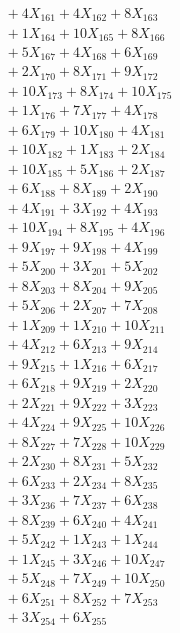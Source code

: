 \documentclass[a4paper,10pt]{article}
\begin{document}
{\begin{align}
&\;  + 4 X_{161} + 4 X_{162} + 8 X_{163} \\[0.5ex]\allowbreak
&\;  + 1 X_{164} + 10 X_{165} + 8 X_{166} \\[0.3ex]
&\;  + 5 X_{167} + 4 X_{168} + 6 X_{169} \\[0.3ex]
&\;  + 2 X_{170} + 8 X_{171} + 9 X_{172} \\[0.3ex]
&\;  + 10 X_{173} + 8 X_{174} + 10 X_{175} \\[0.3ex]
&\;  + 1 X_{176} + 7 X_{177} + 4 X_{178} \\[0.3ex]
&\;  + 6 X_{179} + 10 X_{180} + 4 X_{181} \\[0.3ex]
&\;  + 10 X_{182} + 1 X_{183} + 2 X_{184} \\[0.3ex]
&\;  + 10 X_{185} + 5 X_{186} + 2 X_{187} \\[0.3ex]
&\;  + 6 X_{188} + 8 X_{189} + 2 X_{190} \\[0.3ex]
&\;  + 4 X_{191} + 3 X_{192} + 4 X_{193} \\[0.5ex]\allowbreak
&\;  + 10 X_{194} + 8 X_{195} + 4 X_{196} \\[0.3ex]
&\;  + 9 X_{197} + 9 X_{198} + 4 X_{199} \\[0.3ex]
&\;  + 5 X_{200} + 3 X_{201} + 5 X_{202} \\[0.3ex]
&\;  + 8 X_{203} + 8 X_{204} + 9 X_{205} \\[0.3ex]
&\;  + 5 X_{206} + 2 X_{207} + 7 X_{208} \\[0.3ex]
&\;  + 1 X_{209} + 1 X_{210} + 10 X_{211} \\[0.3ex]
&\;  + 4 X_{212} + 6 X_{213} + 9 X_{214} \\[0.3ex]
&\;  + 9 X_{215} + 1 X_{216} + 6 X_{217} \\[0.3ex]
&\;  + 6 X_{218} + 9 X_{219} + 2 X_{220} \\[0.3ex]
&\;  + 2 X_{221} + 9 X_{222} + 3 X_{223} \\[0.5ex]\allowbreak
&\;  + 4 X_{224} + 9 X_{225} + 10 X_{226} \\[0.3ex]
&\;  + 8 X_{227} + 7 X_{228} + 10 X_{229} \\[0.3ex]
&\;  + 2 X_{230} + 8 X_{231} + 5 X_{232} \\[0.3ex]
&\;  + 6 X_{233} + 2 X_{234} + 8 X_{235} \\[0.3ex]
&\;  + 3 X_{236} + 7 X_{237} + 6 X_{238} \\[0.3ex]
&\;  + 8 X_{239} + 6 X_{240} + 4 X_{241} \\[0.3ex]
&\;  + 5 X_{242} + 1 X_{243} + 1 X_{244} \\[0.3ex]
&\;  + 1 X_{245} + 3 X_{246} + 10 X_{247} \\[0.3ex]
&\;  + 5 X_{248} + 7 X_{249} + 10 X_{250} \\[0.3ex]
&\;  + 6 X_{251} + 8 X_{252} + 7 X_{253} \\[0.5ex]\allowbreak
&\;  + 3 X_{254} + 6 X_{255}\nonumber
\end{align}
}
\end{document}
